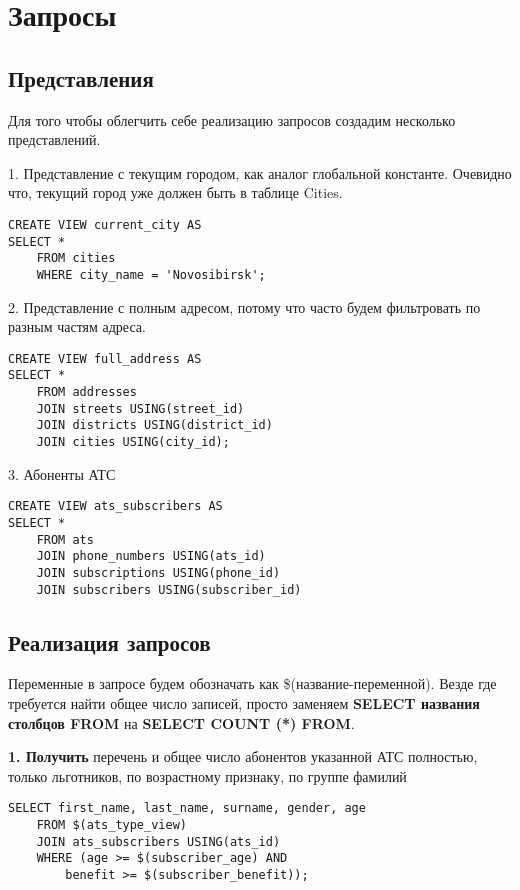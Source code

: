 \documentclass{report}
\begin{document}
\chapter{Запросы}

\section{Представления}

Для того чтобы облегчить себе реализацию запросов создадим несколько
представлений.

1. Представление с текущим городом, как аналог глобальной константе.
Очевидно что, текущий город уже должен быть в таблице Cities.

\begin{lstlisting}
CREATE VIEW current_city AS
SELECT *
    FROM cities 
    WHERE city_name = 'Novosibirsk'; 
\end{lstlisting}

2. Представление с полным адресом, потому что часто будем фильтровать
по разным частям адреса.

\begin{lstlisting}
CREATE VIEW full_address AS
SELECT *
    FROM addresses 
    JOIN streets USING(street_id)
    JOIN districts USING(district_id)
    JOIN cities USING(city_id);
\end{lstlisting}

3. Абоненты АТС
\begin{lstlisting}
CREATE VIEW ats_subscribers AS
SELECT *
    FROM ats
    JOIN phone_numbers USING(ats_id)
    JOIN subscriptions USING(phone_id)
    JOIN subscribers USING(subscriber_id)
\end{lstlisting}

\section{Реализация запросов}

Переменные в запросе будем обозначать как \$(название-переменной). 
Везде где требуется найти общее число записей, просто заменяем
\textbf{SELECT названия столбцов FROM} на 
\textbf{SELECT COUNT (*) FROM}.

\textbf{1. Получить} перечень и общее число абонентов указанной АТС полностью, 
только льготников, по возрастному признаку, по группе фамилий

\begin{lstlisting}
SELECT first_name, last_name, surname, gender, age 
    FROM $(ats_type_view) 
    JOIN ats_subscribers USING(ats_id)
    WHERE (age >= $(subscriber_age) AND
        benefit >= $(subscriber_benefit));
\end{lstlisting}
\end{document}
